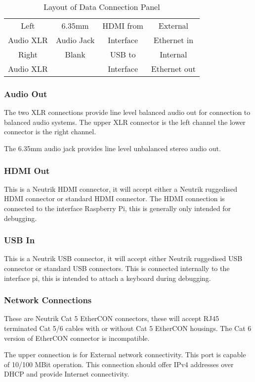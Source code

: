 \begin{table}[h]
\centering
\begin{tabular}[h]{|c|c|c|c|}
\hline
Left & 6.35mm & HDMI from & External \\
Audio XLR & Audio Jack & Interface & Ethernet in \\
\hline
Right & Blank & USB to & Internal \\
Audio XLR & & Interface & Ethernet out \\
\hline
\end{tabular}
\caption{Layout of Data Connection Panel} 
\end{table}


\subsubsection{Audio Out}
The two XLR connections provide line level balanced audio out for connection to balanced audio systems.  The upper XLR connector is the left channel the lower connector is the right channel.

The 6.35mm audio jack provides line level unbalanced stereo audio out.

\subsubsection{HDMI Out}
This is a Neutrik HDMI connector, it will accept either a Neutrik ruggedised HDMI connector or standard HDMI connector.  The HDMI connection is connected to the interface Raspberry Pi, this is generally only intended for debugging.

\subsubsection{USB In}
This is a Neutrik USB connector, it will accept either Neutrik ruggedised USB connector or standard USB connectors.  This is connected internally to the interface pi, this is intended to attach a keyboard during debugging.

\subsubsection{Network Connections}
These are Neutrik Cat 5 EtherCON connectors, these will accept RJ45 terminated Cat 5/6 cables with or without Cat 5 EtherCON housings. 
The Cat 6 version of EtherCON connector is incompatible.

The upper connection is for External network connectivity.  This port is capable of 10/100 MBit operation. This connection should offer IPv4 addresses over DHCP and provide Internet connectivity.

